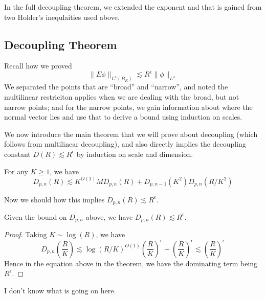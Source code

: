 \begin{remark}
    In the full decoupling theorem, we extended the exponent and that is gained from two Holder's inequlaities used above.
\end{remark}

\subsection*{Decoupling Theorem}
Recall how we proved
\begin{equation*}
    \|E\phi\|_{L^4(B_R)}\lesssim R^\epsilon\|\phi\|_{L^4}
\end{equation*}
We separated the points that are ``broad'' and ``narrow'', and noted the multilinear restriciton applies when we are dealing with the broad, but not narrow points; and for the narrow points, we gain information about where the normal vector lies and use that to derive a bound using induction on scales.

We now introduce the main theorem that we will prove about decoupling (which follows from multilinear decoupling), and also directly implies the decoupling constant $D(R)\lesssim R^\epsilon$ by induction on scale and dimension.

\begin{theorem}[Bound on $D_{p,n}(R)$]
    For any $K\geq 1$, we have
    \begin{equation*}
        D_{p,n}(R)\lesssim K^{O(1)}MD_{p,n}(R)+D_{p,n-1}(K^2)D_{p,n}(R/K^2)
    \end{equation*}
\end{theorem}
Now we should how this implies $D_{p,n}(R)\lesssim R^\epsilon$.
\begin{lemma}
    Given the bound on $D_{p,n}$ above, we have $D_{p,n}(R)\lesssim R^\epsilon$.
\end{lemma}
\begin{proof}
    Taking $K\sim\log(R)$, we have
    \begin{equation*}
        D_{p,n}\left(\frac{R}{K}\right)\lesssim\log(R/K)^{O(1)}\left(\frac{R}{K}\right)^\epsilon+\left(\frac{R}{K}\right)^\epsilon\lesssim\left(\frac{R}{K}\right)^\epsilon
    \end{equation*}
    Hence in the equation above in the theorem, we have the dominating term being $R^\epsilon$.
\end{proof}
\begin{remark}
    I don't know what is going on here.
\end{remark}

